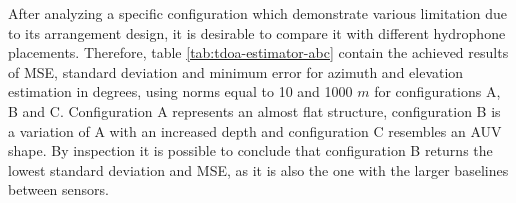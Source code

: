 After analyzing a specific configuration which demonstrate various limitation due to its arrangement design, it is desirable to compare it with different hydrophone placements. Therefore, table \ref{tab:tdoa-estimator-abc} contain the achieved results of MSE, standard deviation and minimum error for azimuth and elevation estimation in degrees, using norms equal to 10 and 1000 $m$ for configurations A, B and C. Configuration A represents an almost flat structure, configuration B is a variation of A with an increased depth and configuration C resembles an AUV shape. By inspection it is possible to conclude that configuration B returns the lowest standard deviation and MSE, as it is also the one with the larger baselines between sensors.

\begin{table}[!htbp] %
	\begin{center}
		\caption{Obtained errors for configurations A,B and C by TDoA estimator}
		\label{tab:tdoa-estimator-abc}
	\end{center}
\end{table}

